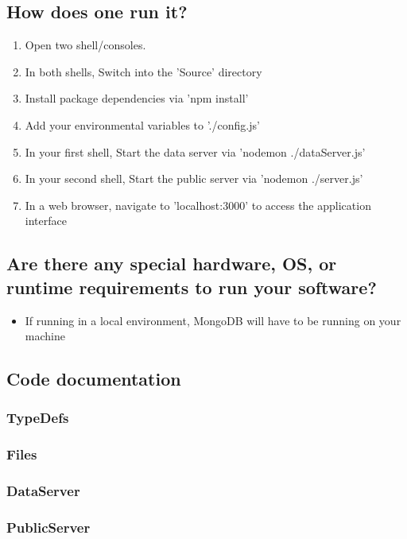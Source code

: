\documentclass[journal,10pt,onecolumn,compsoc]{IEEEtran}
\begin{document}
    \subsection{How does one run it?}
    \begin{enumerate}
        \item Open two shell/consoles.
        \item In both shells, Switch into the 'Source' directory
        \item Install package dependencies via 'npm install'
        \item Add your environmental variables to './config.js'
        \item In your first shell, Start the data server via 'nodemon ./dataServer.js'
        \item In your second shell, Start the public server via 'nodemon ./server.js'
        \item In a web browser, navigate to 'localhost:3000' to access the application interface
    \end{enumerate}
    \subsection{Are there any special hardware, OS, or runtime requirements to run your software?}
    \begin{itemize}
        \item If running in a local environment, MongoDB will have to be running on your machine
    \end{itemize} 
    \subsection{Code documentation}
    \subsubsection{TypeDefs}
    
    \subsubsection{Files}
    
    \subsubsection{DataServer}
    
    \subsubsection{PublicServer}
    
\end{document}
